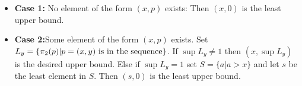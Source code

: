 \documentclass{article}
\numberwithin{problem}{section}
\begin{document}
\begin{itemize}
    \item \textbf{Case 1:} No element of the form $(x,p)$ exists: Then $(x,0)$ is the least upper bound. 
    \item \textbf{Case 2:}Some element of the form $(x,p)$ exists. Set $L_y=\left\{\pi_2(p)|\text{$
    p=(x,y)$ is in the sequence}\right\}$. If $\sup L_y\ne1$ then  $(x,\sup L_y)$ is the desired upper bound. Else if $\sup L_y=1$ set $S=\{a|a>x\}$ and let $s$ be the least element in $S$. Then $(s,0)$ is the least upper bound.
\end{itemize}
\end{document}
